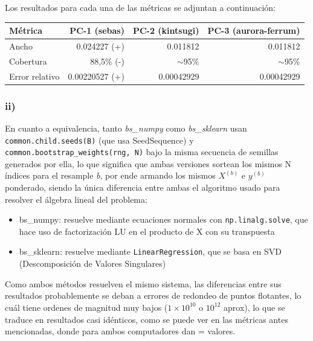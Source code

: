 \documentclass[11pt]{article}
\begin{document}
Los resultados para cada una de las m\'etricas se adjuntan a continuaci\'on:

\begin{center}
\begin{tabular}{lrrr}
\toprule
M\'etrica & PC-1 (sebas) & PC-2 (kintsugi) & PC-3 (aurora-ferrum) \\
\midrule
Ancho & 0.024227 (+) & 0.011812 & 0.011812 \\
Cobertura & 88,5\% (-) & $\sim$95\% & $\sim$95\% \\
Error relativo & 0.00220527 (+) & 0.00042929 & 0.00042929 \\
\bottomrule
\end{tabular}
\end{center}

\subsubsection*{ii)}

En cuanto a equivalencia, tanto \textit{bs\_numpy} como \textit{bs\_sklearn} usan \texttt{common.child.seeds(B)} (que usa SeedSequence) y \texttt{common.bootstrap\_weights(rng, N)} bajo la misma secuencia de semillas generados por ella, lo que significa que ambas versiones sortean los mismos N \'indices para el resample \textit{b}, por ende armando los mismos $X^{(b)}$ e $y^{(b)}$ ponderado, siendo la \'unica diferencia entre ambas el algoritmo usado para resolver el \'algebra lineal del problema:
\begin{itemize}
  \item bs\_numpy: resuelve mediante ecuaciones normales con \texttt{np.linalg.solve}, que hace uso de factorizaci\'on LU en el producto de X con su transpuesta
  \item bs\_sklearn: resuelve mediante \texttt{LinearRegression}, que se basa en SVD (Descomposici\'on de Valores Singulares)
\end{itemize}
Como ambos m\'etodos resuelven el mismo sistema, las diferencias entre sus resultados probablemente se deban a errores de redondeo de puntos flotantes, lo cu\'al tiene ordenes de magnitud muy bajos ($1\times10^{10}$ o $10^{12}$ aprox), lo que se traduce en resultados casi id\'enticos, como se puede ver en las m\'etricas antes mencionadas, donde para ambos computadores dan = valores.
\end{document}
